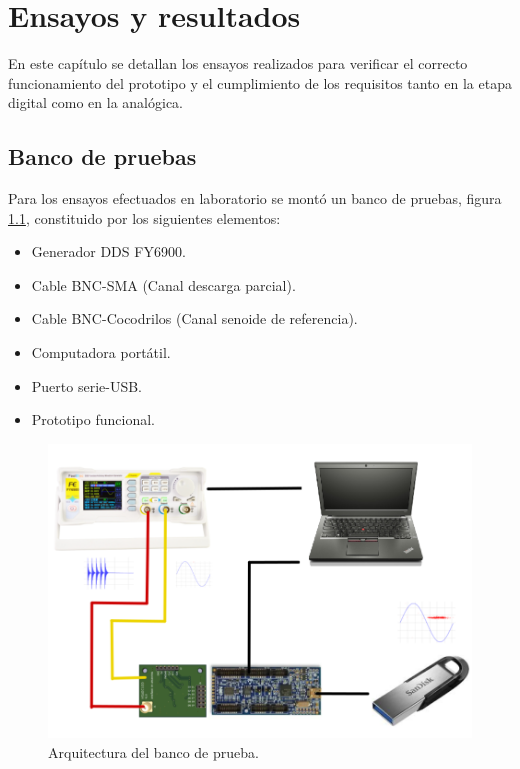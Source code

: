 
\chapter{Ensayos y resultados} %

\label{Chapter4} %
En este capítulo se detallan los ensayos realizados para verificar el correcto funcionamiento del prototipo y el cumplimiento de los requisitos tanto en la etapa digital como en la analógica.

\section{Banco de pruebas}
Para los ensayos efectuados en laboratorio se montó un banco de pruebas, figura \ref{fig:bancoDePruebas}, constituido por los siguientes elementos:

\begin{itemize}
\item Generador DDS FY6900.
\item Cable BNC-SMA (Canal descarga parcial).
\item Cable BNC-Cocodrilos (Canal senoide de referencia).
\item Computadora portátil. 
\item Puerto serie-USB.
\item Prototipo funcional.
\end{itemize}


\begin{figure}[ht]
	\centering
	\includegraphics[width=120mm]{./Figures/bancoDePruebas.png}
	\caption{Arquitectura del banco de prueba.}
	\label{fig:bancoDePruebas}
\end{figure}

